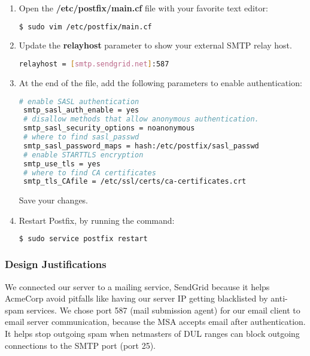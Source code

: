 \begin{enumerate}
 \item { Open the \textbf{/etc/postfix/main.cf} file with your favorite
		text editor:
  \begin{lstlisting}[language=bash]
 $ sudo vim /etc/postfix/main.cf 
   \end{lstlisting}
 }
 \item { Update the \textbf{relayhost} parameter to show your external SMTP
	 relay host.
  \begin{lstlisting}[language=bash]
  relayhost = [smtp.sendgrid.net]:587 
   \end{lstlisting}
 }
 \item {At the end of the file, add the following parameters to enable
	 authentication:
 \begin{lstlisting}[language=bash]
 # enable SASL authentication
 smtp_sasl_auth_enable = yes
 # disallow methods that allow anonymous authentication.
 smtp_sasl_security_options = noanonymous
 # where to find sasl_passwd
 smtp_sasl_password_maps = hash:/etc/postfix/sasl_passwd
 # enable STARTTLS encryption
 smtp_use_tls = yes
 # where to find CA certificates
 smtp_tls_CAfile = /etc/ssl/certs/ca-certificates.crt
 \end{lstlisting}
 Save your changes.
}
 \item { Restart Postfix, by running the command:
 \begin{lstlisting}[language=bash]
 $ sudo service postfix restart
 \end{lstlisting}
 }
\end{enumerate}

\subsubsection{Design Justifications}
We connected our server to a mailing service, SendGrid because it helps
AcmeCorp avoid pitfalls like having our server IP getting blacklisted by
anti-spam services. We chose port 587 (mail submission agent) for our email client to email server
communication, because the MSA accepts email after authentication. It helps
stop outgoing spam when netmasters of DUL ranges can block outgoing connections
to the SMTP port (port 25).
